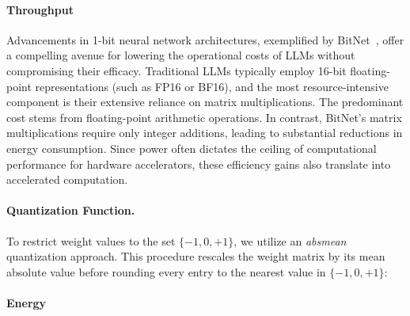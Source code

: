 \paragraph{Throughput}

Advancements in 1-bit neural network architectures, exemplified by BitNet~\cite{bitnet}, offer a compelling avenue for lowering the operational costs of LLMs without compromising their efficacy. Traditional LLMs typically employ 16-bit floating-point representations (such as FP16 or BF16), and the most resource-intensive component is their extensive reliance on matrix multiplications. The predominant cost stems from floating-point arithmetic operations. In contrast, BitNet's matrix multiplications require only integer additions, leading to substantial reductions in energy consumption. Since power often dictates the ceiling of computational performance for hardware accelerators, these efficiency gains also translate into accelerated computation.

\paragraph{Quantization Function.} To restrict weight values to the set $\{-1, 0, +1\}$, we utilize an \emph{absmean} quantization approach. This procedure rescales the weight matrix by its mean absolute value before rounding every entry to the nearest value in $\{-1, 0, +1\}$:

\paragraph{Energy}